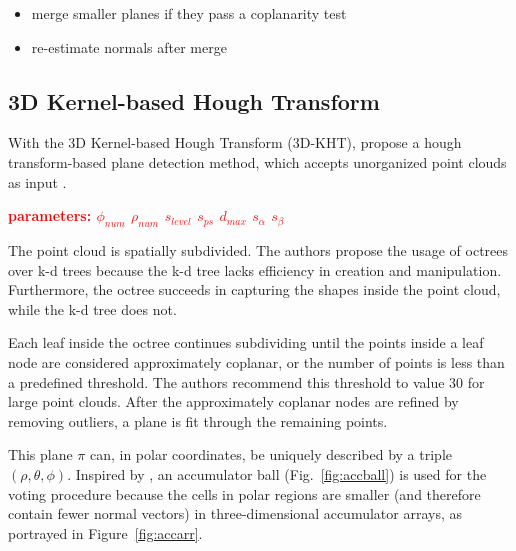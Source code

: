 \documentclass[main.tex]{subfiles}
\begin{document}
\begin{itemize}
    \item merge smaller planes if they pass a coplanarity test
    \item re-estimate normals after merge
\end{itemize}

\subsection{3D Kernel-based Hough Transform}
\label{subsec:bg-3dkht}
With the 3D Kernel-based Hough Transform (3D-KHT),
\citeauthor{LimbergerOliveira2015HT3D}\cite{LimbergerOliveira2015HT3D} propose a hough transform-based plane detection method,
which accepts unorganized point clouds as input \cite{LimbergerOliveira2015HT3D}.

\textbf{\textcolor{red}{parameters: $\phi_{num}$  $\rho_{num}$  $s_{level}$  $s_{ps}$  $d_{max}$     $s_\alpha$  $s_\beta$}}

The point cloud is spatially subdivided. The authors propose the usage of octrees over k-d trees because the k-d tree lacks efficiency in creation and manipulation.
Furthermore, the octree succeeds in capturing the shapes inside the point cloud, while the k-d tree does not.

Each leaf inside the octree continues subdividing until the points inside a leaf node are considered approximately coplanar, or the number of points is less than a predefined threshold.
The authors recommend this threshold to value 30 for large point clouds.
After the approximately coplanar nodes are refined by removing outliers, a plane is fit through the remaining points.


This plane $\pi$ can, in polar coordinates, be uniquely described by a triple $(\rho, \theta, \phi)$.
Inspired by \citeauthor{Borrmann_Elseberg_Lingemann_Nüchter_2011}\cite{Borrmann_Elseberg_Lingemann_Nüchter_2011}, an accumulator ball (Fig.~\ref{fig:accball}) is used for the voting procedure because the cells in polar regions are smaller (and therefore
contain fewer normal vectors) in three-dimensional accumulator arrays, as portrayed in Figure~\ref{fig:accarr}.
\end{document}
